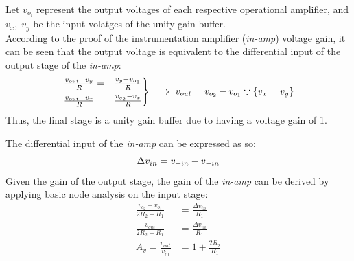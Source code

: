 \documentclass{article}
\begin{document}
Let $v_{o_i}$ represent the output voltages of each respective operational amplifier, and $v_x,\;v_y$ be the input volatges of the unity gain buffer. \\ 

According to the proof of the instrumentation amplifier (\textit{in-amp}) voltage gain, it can be seen that the output voltage is equivalent to the differential input of the output stage of the \textit{in-amp}:
\[
    \begin{rcases}
        \frac{v_{out} - v_y}{R} =& \frac{v_y - v_{o_1}}{R} \\
        \frac{v_{out} - v_x}{R} =& \frac{v_{o_2} - v_x}{R}
    \end{rcases} \implies v_{out} = v_{o_2} - v_{o_1} \because \{v_x = v_y\}
\]
Thus, the final stage is a unity gain buffer due to having a voltage gain of 1. 

The differential input of the \textit{in-amp} can be expressed as so: 
\begin{equation*}
    \Delta v_{in} = v_{+in} - v_{-in} \\
\end{equation*}
Given the gain of the output stage, the gain of the \textit{in-amp} can be derived by applying basic node analysis on the input stage:
\begin{equation*}
    \begin{aligned}
        \frac{v_{o_2} - v_{o_1}}{2R_2 + R_1} &= \frac{\Delta v_{in}}{R_1} \\
        \frac{v_{out}}{2R_2 + R_1} &= \frac{\Delta v_{in}}{R_1} \\
        A_v = \frac{v_{out}}{v_{in}} &= 1 + \frac{2R_2}{R_1}
    \end{aligned}
\end{equation*}

\end{document}
